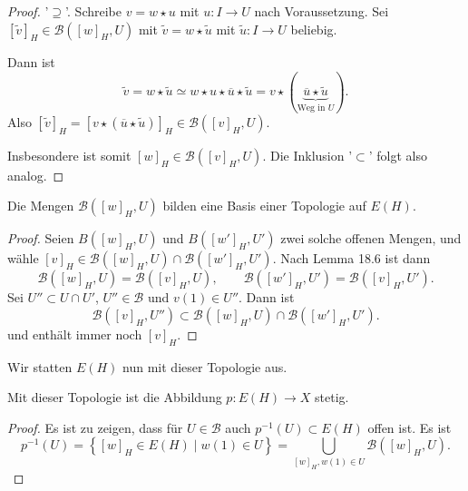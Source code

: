 \begin{proof}
    '$\supseteq$'. Schreibe $v = w \star u$ mit  $u\colon  I \to  U$ nach Voraussetzung. Sei $[\tilde{v}]_H \in \mathcal{B}([w]_H,U)$ mit $\tilde{v} = w \star \tilde{u}$ mit $\tilde{u}\colon  I \to  U$ beliebig.

    Dann ist
    \[
        \tilde{v} = w \star \tilde{u} \simeq w \star u \star \overline{u} \star \tilde{u} = v \star (\underbrace{\overline{u} \star \tilde{u}}_{\text{Weg in $U$}})
    .\] 
    Also $[\tilde{v}]_H = [v \star (\overline{u} \star \tilde{u})]_H \in \mathcal{B}([v]_H, U)$.

    Insbesondere ist somit $[w]_H \in  \mathcal{B}([v]_H, U)$. Die Inklusion '$\subset $' folgt also analog.
\end{proof}

\begin{proposition}
    Die Mengen $\mathcal{B}([w]_H, U)$ bilden eine Basis einer Topologie auf $E(H)$.
\end{proposition}

\begin{proof}
    Seien $B([w]_H, U)$ und  $B([w']_H, U')$ zwei solche offenen Mengen, und wähle  $[v]_H \in \mathcal{B}([w]_H, U) \cap \mathcal{B}([w']_H, U')$. Nach Lemma 18.6 ist dann
    \[
        \mathcal{B}([w]_H, U) = \mathcal{B}([v]_H, U), \qquad \mathcal{B}([w']_H, U') = \mathcal{B}([v]_H, U')
    .\] 
    Sei $U'' \subset U \cap  U'$, $U'' \in \mathcal{B}$ und $v(1) \in U''$. Dann ist
    \[
        \mathcal{B}([v]_H, U'') \subset \mathcal{B}([w]_H, U) \cap \mathcal{B}([w']_H, U')
    .\] 
    und enthält immer noch $[v]_H$.
\end{proof}

Wir statten $E(H)$ nun mit dieser Topologie aus.

 \begin{corollary}
     Mit dieser Topologie ist die Abbildung $p\colon  E(H) \to  X$ stetig.
\end{corollary}


\begin{proof}
    Es ist zu zeigen, dass für $U\in \mathcal{B}$ auch $p^{-1} (U)\subset E(H)$ offen ist. Es ist
    \[
        p^{-1} (U) = \left \{[w]_H \in E(H) \mid  w(1) \in U\right\} = \bigcup_{[w]_H, w(1) \in U}  \mathcal{B}([w]_H, U)
    .\] 
\end{proof}
